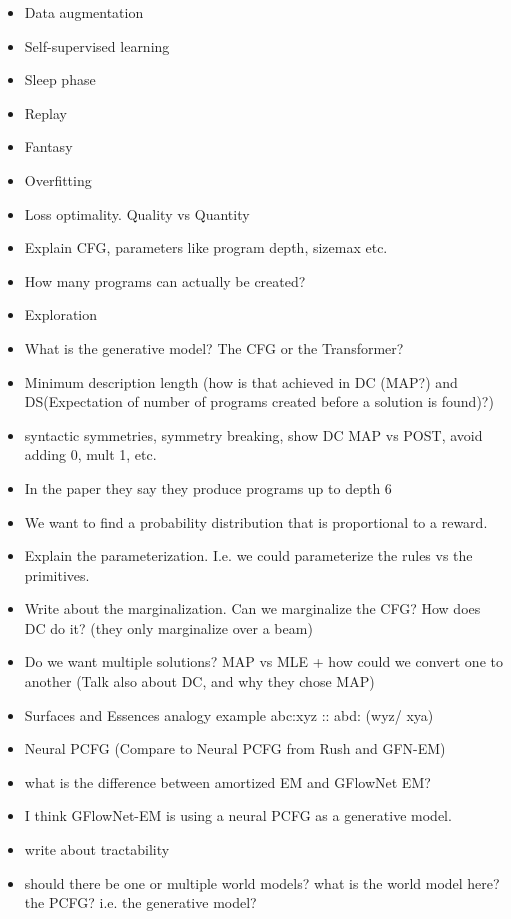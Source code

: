 \begin{itemize}
    \item Data augmentation
    \item Self-supervised learning
    \item Sleep phase
    \item Replay 
    \item Fantasy
    \item Overfitting
    \item Loss optimality. Quality vs Quantity
    \item Explain CFG, parameters like program depth, sizemax etc. 
    \item How many programs can actually be created?
    \item Exploration
    \item What is the generative model? The CFG or the Transformer?
    \item Minimum description length (how is that achieved in DC (MAP?) and DS(Expectation of number of programs created before a solution is found)?)
    \item syntactic symmetries, symmetry breaking, show DC MAP vs POST, avoid adding 0, mult 1, etc. 
    \item In the paper they say they produce programs up to depth 6
    \item We want to find a probability distribution that is proportional to a reward.
    \item Explain the parameterization. I.e. we could parameterize the rules vs the primitives. 
    \item Write about the marginalization. Can we marginalize the CFG? How does DC do it? (they only marginalize over a beam) 
    \item Do we want multiple solutions? MAP vs MLE + how could we convert one to another (Talk also about DC, and why they chose MAP)
    \item Surfaces and Essences analogy example abc:xyz :: abd: (wyz/ xya) 
    \item Neural PCFG (Compare to Neural PCFG from Rush and GFN-EM)
    \item what is the difference between amortized EM and GFlowNet EM?
    \item I think GFlowNet-EM is using a neural PCFG as a generative model. 
    \item write about tractability
    \item should there be one or multiple world models?  what is the world model here? the PCFG? i.e. the generative model? 

\end{itemize}

